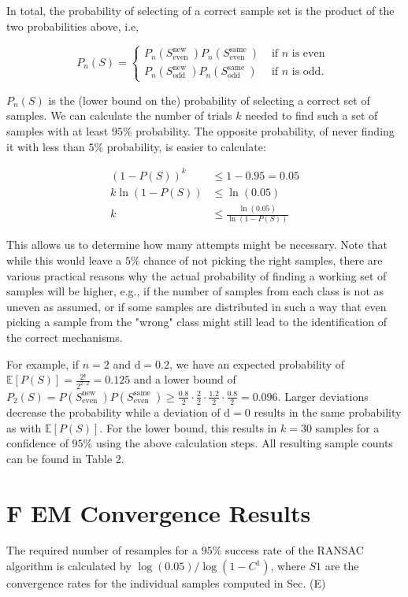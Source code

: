\documentclass[10pt]{article}
\begin{document}
In total, the probability of selecting of a correct sample set is the product of the two probabilities above, i.e,

\[
P_{n}(S)= \begin{cases}P_{n}\left(S_{\text {even }}^{\text {new }}\right) P_{n}\left(S_{\text {even }}^{\text {same }}\right) & \text { if } n \text { is even }  \tag{3}\\ P_{n}\left(S_{\text {odd }}^{\text {new }}\right) P_{n}\left(S_{\text {odd }}^{\text {same }}\right) & \text { if } n \text { is odd. }\end{cases}
\]

$P_{n}(S)$ is the (lower bound on the) probability of selecting a correct set of samples. We can calculate the number of trials $k$ needed to find such a set of samples with at least $95 \%$ probability. The opposite probability, of never finding it with less than $5 \%$ probability, is easier to calculate:

$$
\begin{aligned}
(1-P(S))^{k} & \leq 1-0.95=0.05 \\
k \ln (1-P(S)) & \leq \ln (0.05) \\
k & \leq \frac{\ln (0.05)}{\ln (1-P(S))}
\end{aligned}
$$

This allows us to determine how many attempts might be necessary. Note that while this would leave a $5 \%$ chance of not picking the right samples, there are various practical reasons why the actual probability of finding a working set of samples will be higher, e.g., if the number of samples from each class is not as uneven as assumed, or if some samples are distributed in such a way that even picking a sample from the "wrong" class might still lead to the identification of the correct mechanisms.

For example, if $n=2$ and $\mathrm{d}=0.2$, we have an expected probability of $\mathbb{E}[P(S)]=\frac{2!}{2^{2 \cdot 2}}=0.125$ and a lower bound of $P_{2}(S)=P\left(S_{\text {even }}^{\text {new }}\right) P\left(S_{\text {even }}^{\text {same }}\right) \geq \frac{0.8}{2} \cdot \frac{2}{2} \cdot \frac{1.2}{2} \cdot \frac{0.8}{2}=0.096$. Larger deviations decrease the probability while a deviation of $\mathrm{d}=0$ results in the same probability as with $\mathbb{E}[P(S)]$. For the lower bound, this results in $k=30$ samples for a confidence of $95 \%$ using the above calculation steps. All resulting sample counts can be found in Table 2.

\section*{F EM Convergence Results}
The required number of resamples for a $95 \%$ success rate of the RANSAC algorithm is calculated by $\log (0.05) / \log \left(1-C^{1}\right)$, where $S 1$ are the convergence rates for the individual samples computed in Sec. (E)
\end{document}

